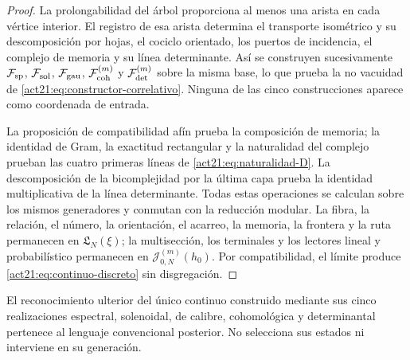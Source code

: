 \begin{proof}
La prolongabilidad del árbol proporciona al menos una arista en cada vértice
interior. El registro de esa arista determina el transporte isométrico y su
descomposición por hojas, el cociclo orientado, los puertos de incidencia, el
complejo de memoria y su línea determinante. Así se construyen sucesivamente
\(\mathcal F_{\rm sp}\), \(\mathcal F_{\rm sol}\),
\(\mathcal F_{\rm gau}\), \(\mathcal F_{\rm coh}^{(m)}\) y
\(\mathcal F_{\rm det}^{(m)}\) sobre la misma base, lo que prueba la no
vacuidad de \eqref{act21:eq:constructor-correlativo}. Ninguna de las cinco
construcciones aparece como coordenada de entrada.

La proposición de compatibilidad afín prueba la composición de memoria; la
identidad de Gram, la exactitud rectangular y la naturalidad del complejo
prueban las cuatro primeras líneas de \eqref{act21:eq:naturalidad-D}. La
descomposición de la bicomplejidad por la última capa prueba la identidad
multiplicativa de la línea determinante. Todas estas operaciones se calculan
sobre los mismos generadores y conmutan con la reducción modular. La fibra,
la relación, el número, la orientación, el acarreo, la memoria, la frontera y
la ruta permanecen en \(\mathfrak L_N(\xi)\); la multisección, los terminales
y los lectores lineal y probabilístico permanecen en
\(\mathcal J_{0,N}^{(m)}(h_0)\). Por compatibilidad, el límite produce
\eqref{act21:eq:continuo-discreto} sin disgregación.
\end{proof}

El reconocimiento ulterior del único continuo construido mediante sus cinco
realizaciones espectral, solenoidal, de calibre, cohomológica y determinantal
pertenece al lenguaje convencional posterior. No selecciona sus estados ni
interviene en su generación.
\fi


